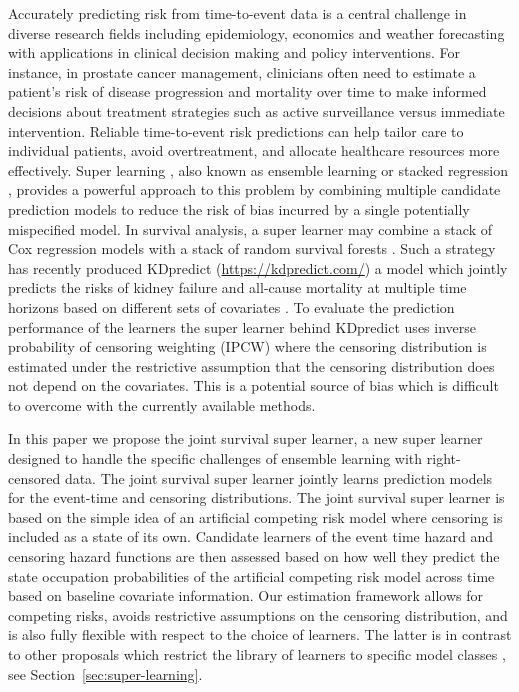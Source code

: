 \documentclass[a4paper,danish]{article}
\theoremstyle{plain} %
\numberwithin{theorem}{section}
\theoremstyle{definition} %
\theoremstyle{remark}
\newcommand{\1}{\mathds{1}}
\begin{document}
Accurately predicting risk from time-to-event data is a central
challenge in diverse research fields including epidemiology, economics
and weather forecasting with applications in clinical
decision making and policy interventions. For instance, in prostate
cancer management, clinicians often need to estimate a patient’s risk
of disease progression and mortality over time to make informed
decisions about treatment strategies such as active surveillance
versus immediate intervention. Reliable time-to-event risk predictions
can help tailor care to individual patients, avoid overtreatment, and
allocate healthcare resources more effectively. Super learning
\citep{van2007super}, also known as ensemble learning or stacked
regression \citep{wolpert1992stacked,breiman1996stacked}, provides a
powerful approach to this problem by combining multiple
candidate prediction models to reduce the risk of bias incurred by a
single potentially mispecified model. In survival analysis, a super
learner may combine a stack of Cox regression models with a stack of
random survival forests \citep[][Section 8.4]{gerds2021medical}. Such
a strategy has recently produced KDpredict
(\url{https://kdpredict.com/}) a model which jointly predicts the
risks of kidney failure and all-cause mortality at multiple time
horizons based on different sets of covariates
\citep{liu2024predicting}. To evaluate the prediction performance of
the learners the super learner behind KDpredict uses inverse
probability of censoring weighting (IPCW) where the censoring
distribution is estimated under the restrictive assumption that the
censoring distribution does not depend on the covariates. This is a
potential source of bias which is difficult to overcome with the
currently available methods.


In this paper we propose the joint survival super learner, a new super
learner designed to handle the specific challenges of ensemble
learning with right-censored data. The joint survival super learner
jointly learns prediction models for the event-time and censoring
distributions. The joint survival super learner is based on the simple
idea of an artificial competing risk model where censoring is included
as a state of its own. Candidate learners of the event time hazard and
censoring hazard functions are then assessed based on how well they
predict the state occupation probabilities of the artificial competing
risk model across time based on baseline covariate information. Our
estimation framework allows for competing risks, avoids restrictive
assumptions on the censoring distribution, and is also fully flexible
with respect to the choice of learners. The latter is in contrast to
other proposals which restrict the library of learners to specific
model classes \citep{polley2011-sl-cens,golmakani2020super}, see
Section~\ref{sec:super-learning}.
\end{document}
